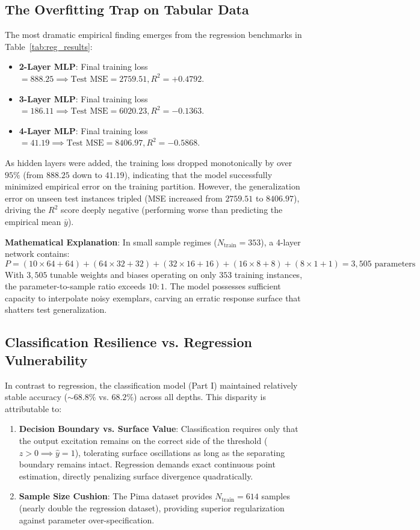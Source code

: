 \documentclass[12pt]{article}
\begin{document}
\subsection{The Overfitting Trap on Tabular Data}
The most dramatic empirical finding emerges from the regression benchmarks in Table~\ref{tab:reg_results}:
\begin{itemize}
    \item \textbf{2-Layer MLP}: Final training loss $= 888.25 \implies \text{Test MSE} = 2759.51, R^2 = \mathbf{+0.4792}$.
    \item \textbf{3-Layer MLP}: Final training loss $= 186.11 \implies \text{Test MSE} = 6020.23, R^2 = \mathbf{-0.1363}$.
    \item \textbf{4-Layer MLP}: Final training loss $= 41.19 \implies \text{Test MSE} = 8406.97, R^2 = \mathbf{-0.5868}$.
\end{itemize}

As hidden layers were added, the training loss dropped monotonically by over $95\%$ (from $888.25$ down to $41.19$), indicating that the model successfully minimized empirical error on the training partition. However, the generalization error on unseen test instances tripled (MSE increased from $2759.51$ to $8406.97$), driving the $R^2$ score deeply negative (performing worse than predicting the empirical mean $\bar{y}$).

\textbf{Mathematical Explanation}: In small sample regimes ($N_{\text{train}} = 353$), a 4-layer network contains:
\begin{equation}
    P = (10 \times 64 + 64) + (64 \times 32 + 32) + (32 \times 16 + 16) + (16 \times 8 + 8) + (8 \times 1 + 1) = 3,505 \text{ parameters}
\end{equation}
With $3,505$ tunable weights and biases operating on only $353$ training instances, the parameter-to-sample ratio exceeds $10:1$. The model possesses sufficient capacity to interpolate noisy exemplars, carving an erratic response surface that shatters test generalization.

\subsection{Classification Resilience vs. Regression Vulnerability}
In contrast to regression, the classification model (Part I) maintained relatively stable accuracy ($\sim 68.8\%$ vs. $68.2\%$) across all depths. This disparity is attributable to:
\begin{enumerate}
    \item \textbf{Decision Boundary vs. Surface Value}: Classification requires only that the output excitation remains on the correct side of the threshold ($z > 0 \implies \hat{y}=1$), tolerating surface oscillations as long as the separating boundary remains intact. Regression demands exact continuous point estimation, directly penalizing surface divergence quadratically.
    \item \textbf{Sample Size Cushion}: The Pima dataset provides $N_{\text{train}} = 614$ samples (nearly double the regression dataset), providing superior regularization against parameter over-specification.
\end{enumerate}
\end{document}
